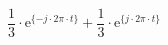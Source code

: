 \[
 \frac{1}{3}\cdot\textrm{e}^{\{-j \cdot 2\pi \cdot t \}}
+\frac{1}{3}\cdot\textrm{e}^{\{ j \cdot 2\pi \cdot t \}}
\]
